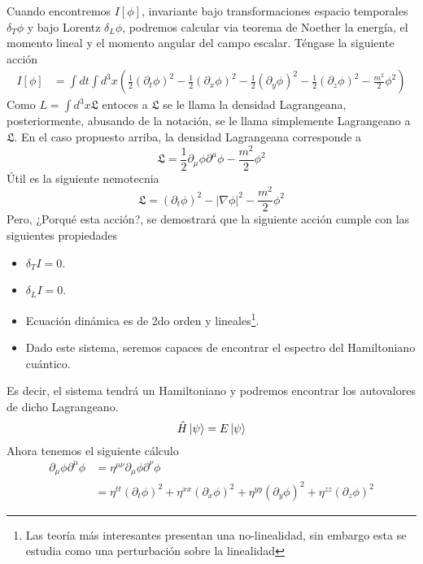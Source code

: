 \documentclass[../main.tex]{subfiles}
\begin{document}
Cuando encontremos $I[\phi]$, invariante bajo transformaciones espacio temporales $\delta_T\phi$ y bajo Lorentz $\delta_L\phi$, podremos calcular via teorema de Noether la energía, el momento lineal y el momento angular del campo escalar. Téngase la siguiente acción
\begin{align*}
  I[\phi] & = \int dt \int d^3x \left( \frac{1}{2}\left( \partial_t \phi \right)^2 -  \frac{1}{2}\left( \partial_x \phi \right)^2 - \frac{1}{2}\left( \partial_y \phi \right)^2 - \frac{1}{2}\left( \partial_z \phi \right)^2 - \frac{m^2}{2}\phi^2\right)
\end{align*}
Como $L=\int d^3 x \mathfrak{L}$ entoces a $\mathfrak{L}$ se le llama la densidad Lagrangeana, posteriormente, abusando de la notación, se le llama simplemente Lagrangeano a $\mathfrak{L}$. En el caso propuesto arriba, la densidad Lagrangeana corresponde a
\begin{equation*}
  \mathfrak{L} = \frac{1}{2}\partial_\mu \phi \partial^\mu \phi - \frac{m^2}{2}\phi^2
\end{equation*}
Útil es la siguiente nemotecnia
\begin{equation}
  \mathfrak{L} = \left( \partial_t\phi \right)^2 - |\nabla \phi|^2 - \frac{m^2}{2}\phi^2
\end{equation}
Pero, ¿Porqué esta acción?, se demostrará que la siguiente acción cumple con las siguientes propiedades
\begin{itemize}
  \item $\delta_TI=0$.
  \item $\delta_L I = 0$.
  \item Ecuación dinámica es de 2do orden y lineales\footnote{Las teoría más interesantes presentan una no-linealidad, sin embargo esta se estudia como una perturbación sobre la linealidad}.
  \item Dado este sistema, seremos capaces de encontrar el espectro del Hamiltoniano cuántico. 
\end{itemize}
Es decir, el sistema tendrá un  Hamiltoniano y podremos encontrar los autovalores de dicho Lagrangeano.
\begin{equation}
  \hat{H}\ket{\psi} = E\ket{\psi}
\end{equation}
Ahora tenemos el siguiente cálculo
\begin{align*}
  \partial_\mu \phi \partial^\mu \phi & = \eta^{\mu \nu} \partial_\mu  \phi \partial^\nu \phi \\
  & = \eta^{tt}\left( \partial_t \phi \right)^2 + \eta^{xx}\left( \partial_x \phi \right)^2 + \eta^{yy}\left( \partial_y\phi \right)^2 + \eta^{zz}\left( \partial_z \phi \right)^2
\end{align*}
\end{document}
